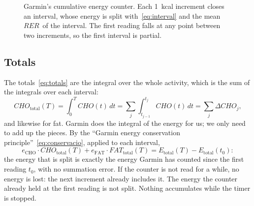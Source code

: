 \documentclass[10pt,a4paper]{article}
\newcommand{\sub}[1]{{\scriptscriptstyle\mathrm{#1}}}   %
\newcommand{\CHO}{\sub{CHO}}
\newcommand{\FAT}{\sub{FAT}}
\newcommand{\tot}{\sub{total}}
\newcommand{\cho}{\ensuremath{\mathit{CHO}}}               %
\newcommand{\fat}{\ensuremath{\mathit{FAT}}}
\newcommand{\RER}{\ensuremath{\mathit{RER}}}
\begin{document}
\begin{figure}[H]
\centering
{}
\caption{Garmin's cumulative energy counter. Each 1~kcal increment closes an interval,
whose energy is split with~\eqref{eq:interval} and the mean \RER\ of the interval. The first
reading falls at any point between two increments, so the first interval is partial.}
\label{fig:comptador}
\end{figure}

\subsection{Totals}
The totals~\eqref{eq:totals} are the integral over the whole activity, which is the sum of
the integrals over each interval:
\begin{equation}
  \cho_{\tot}(T)=\int_0^T\cho(t)\,dt=\sum_j\int_{t_{j-1}}^{t_j}\cho(t)\,dt=\sum_j\Delta\cho_j ,
\end{equation}
and likewise for fat. Garmin does the integral of the energy for us; we only need to add up
the pieces. By the ``Garmin energy conservation principle''~\eqref{eq:conservacio}, applied
to each interval,
\begin{equation}
  e_{\CHO}\cdot\cho_{\tot}(T)+e_{\FAT}\cdot\fat_{\tot}(T)=E_{\tot}(T)-E_{\tot}(t_0):
\end{equation}
the energy that is split is exactly the energy Garmin has counted since the first reading
$t_0$, with no summation error. If the counter is not read for a while, no energy is lost:
the next increment already includes it. The energy the counter already held at the first
reading is not split. Nothing accumulates while the timer is stopped.
\end{document}
